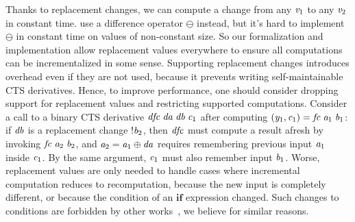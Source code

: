 \label{sec:annoying-replacement}
Thanks to replacement changes, we can compute a change from any \ensuremath{\Varid{v}_{1}} to any \ensuremath{\Varid{v}_{2}}
in constant time. \citet{CaiEtAl2014ILC} use a difference operator \ensuremath{\ominus } instead, but
it's hard to implement \ensuremath{\ominus } in constant time on values of non-constant size.
So our formalization and implementation allow replacement values everywhere to
ensure all computations can be incrementalized in some sense.
Supporting replacement changes introduces overhead even if they are not used,
because it prevents writing self-maintainable CTS derivatives. Hence, to improve
performance, one should consider dropping support for replacement values and
restricting supported computations.
Consider a call to a binary CTS derivative \ensuremath{\Varid{dfc}\;\Varid{da}\;\Varid{db}\;\Varid{c}_{1}} after computing \ensuremath{(\Varid{y}_{1},\Varid{c}_{1})\mathrel{=}\Varid{fc}\;\Varid{a}_{1}\;\Varid{b}_{1}}: if \ensuremath{\Varid{db}} is a replacement change \ensuremath{\mathbin{!}\Varid{b}_{2}}, then \ensuremath{\Varid{dfc}} must compute
a result afresh by invoking \ensuremath{\Varid{fc}\;\Varid{a}_{2}\;\Varid{b}_{2}}, and \ensuremath{\Varid{a}_{2}\mathrel{=}\Varid{a}_{1}\oplus \Varid{da}} requires
remembering previous input \ensuremath{\Varid{a}_{1}} inside \ensuremath{\Varid{c}_{1}}. By the same argument, \ensuremath{\Varid{c}_{1}} must
also remember input \ensuremath{\Varid{b}_{1}}. Worse, replacement values are only needed to handle
cases where incremental computation reduces to recomputation, because the new
input is completely different, or because the condition of an \ensuremath{\mathbf{if}} expression
changed. Such changes to conditions are forbidden by other
works~\citep{Koch2016incremental}, we believe for similar reasons.

